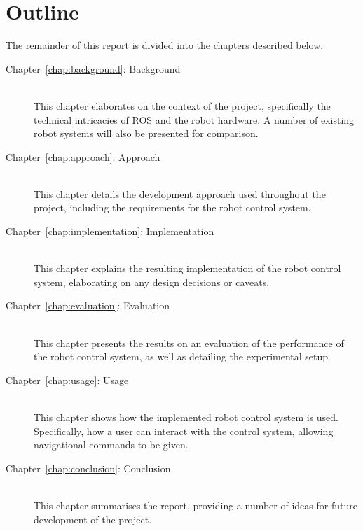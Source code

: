 
\section{Outline}

The remainder of this report is divided into the chapters described below.

\begin{description}
	\item[Chapter~\ref{chap:background}: Background] \hfill \\
	This chapter elaborates on the context of the project, specifically the technical intricacies of ROS and the robot hardware. A number of existing robot systems will also be presented for comparison.

	\item[Chapter~\ref{chap:approach}: Approach] \hfill \\
	This chapter details the development approach used throughout the project, including the requirements for the robot control system.

	\item[Chapter~\ref{chap:implementation}: Implementation] \hfill \\
	This chapter explains the resulting implementation of the robot control system, elaborating on any design decisions or caveats.

	\item[Chapter~\ref{chap:evaluation}: Evaluation] \hfill \\
	This chapter presents the results on an evaluation of the performance of the robot control system, as well as detailing the experimental setup.

	\item[Chapter~\ref{chap:usage}: Usage] \hfill \\
	This chapter shows how the implemented robot control system is used. Specifically, how a user can interact with the control system, allowing navigational commands to be given.

	\item[Chapter~\ref{chap:conclusion}: Conclusion] \hfill \\
	This chapter summarises the report, providing a number of ideas for future development of the project.
\end{description}